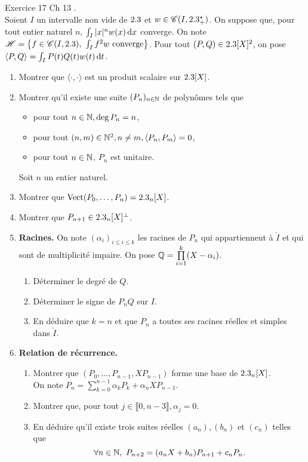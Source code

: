 \begin{exercice}
    Exercice 17 Ch 13 \cite{acamanes}. \\
    Soient $I$ un intervalle non vide de $2.3$ et $w \in \mathscr{C}(I, 2.3^\star_+)$. On suppose que, pour tout entier naturel $n$, $\int_I |x|^n w(x) \, \mathrm{d} x$ converge. On note $\mathscr{H} = \left\{ f \in \mathscr{C}(I, 2.3),\ \int_I f^2 w \text{ converge} \right\}$. Pour tout $(P, Q) \in 2.3[X]^2$, on pose $\langle P, Q \rangle = \int_I P(t) Q(t) w(t) \, \mathrm{d} t$.
    \begin{enumerate}
        \item Montrer que $\langle \cdot, \cdot \rangle$ est un produit scalaire sur $2.3[X]$.
        \item Montrer qu'il existe une suite $(P_n)_{n \in \mathbb{N}}$ de polynômes tels que 
        \begin{itemize}
            \item pour tout $n \in \mathbb{N}, \deg P_n = n$,
            \item pour tout $(n, m) \in \mathbb{N}^2, n \not= m, \langle P_n, P_m \rangle = 0$,
            \item pour tout $n \in \mathbb{N}$, $P_n$ est unitaire.
        \end{itemize}
        Soit $n$ un entier naturel.
        \item Montrer que $\mathrm{Vect}(P_0, \dots, P_n) = 2.3_n[X]$.
        \item Montrer que $P_{n+1} \in 2.3_n[X]^\perp$.
        \item \textbf{Racines.} On note $(\alpha_i)_{i \leqslant i \leqslant k}$ les racines de $P_n$ qui appartiennent à $\mathring{I}$ et qui sont de multiplicité impaire. On pose $\mathbb{Q} = \prod\limits_{i=1}^k (X - \alpha_i)$.
        \begin{enumerate}
            \item Déterminer le degré de $Q$.
            \item Déterminer le signe de $P_n Q$ sur $I$.
            \item En déduire que $k = n$ et que $P_n$ a toutes ses racines réelles et simples dans $\mathring{I}$.
        \end{enumerate}
        \item \textbf{Relation de récurrence.}
        \begin{enumerate}
            \item Montrer que $(P_0, \dots, P_{n-1}, X P_{n-1})$ forme une base de $2.3_n[X]$. \\
        On note $P_n = \sum\limits_{k=0}^{n-1} \alpha_k P_k + \alpha_n X P_{n-1}$.
            \item Montrer que, pour tout $j \in \llbracket 0, n - 3 \rrbracket, \alpha_j = 0$.
            \item En déduire qu'il existe trois suites réelles $(a_n), (b_n)$ et $(c_n)$ telles que 
            $$\forall n \in \mathbb{N},\ P_{n+2} = (a_n X + b_n) P_{n+1} + c_n P_n.$$
        \end{enumerate}
    \end{enumerate}
\end{exercice}
